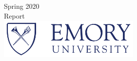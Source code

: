 \begin{titlepage}

{\Large Spring 2020 \\Report}\\[1cm] %


\includegraphics[height=2cm,width=7cm]{EU_hz_280.png}\\[1cm] %
 

\vfill %

\end{titlepage}


